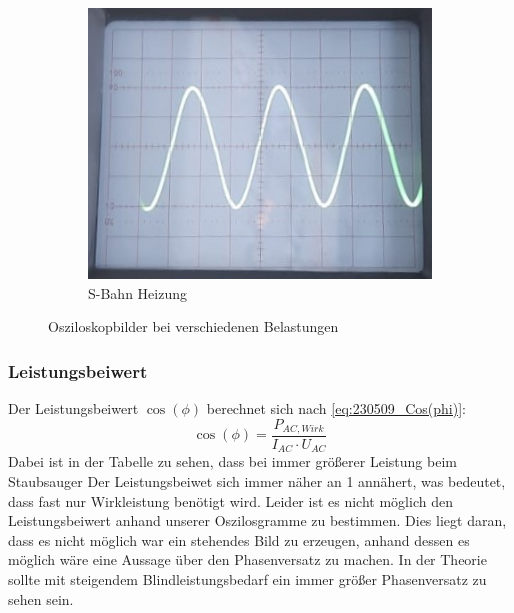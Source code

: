 \begin{figure}[H]
\begin{subfigure}[c]{0.19\textwidth}
		\includegraphics[width=\textwidth]{Abbildungen/Oszi_S-Bahn_Heiz.jpg}
		\caption{S-Bahn Heizung}
	\end{subfigure}
	\caption{Osziloskopbilder bei verschiedenen Belastungen}
	\label{fig:oszi}
\end{figure}


\subsubsection{Leistungsbeiwert}
Der Leistungsbeiwert $ \cos(\phi) $ berechnet sich nach \autoref{eq:230509_Cos(phi)}:
%
\begin{equation}
	\cos(\phi)=\frac{ P_{ AC,Wirk } }{  I_{ AC } \cdot U_{AC }}
	\label{eq:230509_Cos(phi)}
\end{equation}
%
Dabei ist in der Tabelle zu sehen, dass bei immer größerer Leistung beim Staubsauger Der Leistungsbeiwet sich immer näher an 1 annähert, was bedeutet, dass fast nur Wirkleistung benötigt wird. 
Leider ist es nicht möglich den Leistungsbeiwert anhand unserer Oszilosgramme zu bestimmen. 
Dies liegt daran, dass es nicht möglich war ein stehendes Bild zu erzeugen, anhand dessen es möglich wäre eine Aussage über den Phasenversatz zu machen. 
In der Theorie sollte mit steigendem Blindleistungsbedarf ein immer größer Phasenversatz zu sehen sein.